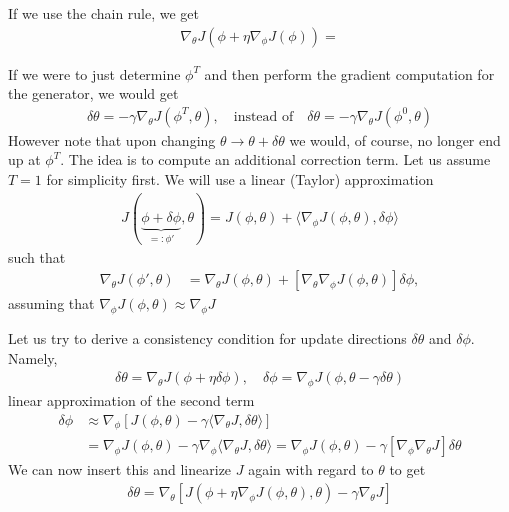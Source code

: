 \documentclass{article}
\begin{document}
\begin{enumerate}
\newpage

If we use the chain rule, we get 
\begin{align}
\nabla_\theta J(\phi+ \eta \nabla_\phi J(\phi))  = 
\end{align}


\newpage

If we were to just determine $\phi^T$ and then perform the gradient computation for the generator, we would get 
\begin{align}
\delta \theta = -\gamma \nabla_\theta J(\phi^T,\theta), \quad \text{instead of} \quad  
\delta \theta = -\gamma \nabla_\theta J(\phi^0,\theta)
\end{align}
However note that upon changing $\theta \to \theta + \delta \theta$ we would, of course, no longer end up at $\phi^T$. The idea is to compute an additional correction term. Let us assume $T=1$ for simplicity first. We will use a linear (Taylor) approximation  
\begin{align}
J(\underbrace{\phi + \delta \phi}_{=:\phi'}, \theta) = J(\phi,\theta) + \langle \nabla_\phi J(\phi,\theta),\delta \phi\rangle
\end{align}
such that 
\begin{align}
\nabla_\theta J(\phi',\theta) & =  \nabla_\theta J(\phi,\theta) + [\nabla_\theta \nabla_\phi J(\phi,\theta)] \delta \phi,
\end{align}
assuming that $\nabla_\phi J(\phi,\theta) \approx \nabla_\phi J$
\newpage

Let us try to derive a consistency condition for update directions $\delta \theta$  and $\delta \phi$. Namely,
\begin{align}
\delta \theta = \nabla_\theta J(\phi + \eta \delta \phi), \quad 
\delta \phi = \nabla_\phi J(\phi, \theta - \gamma \delta \theta)
\end{align}
linear approximation of the second term
\begin{align}
\delta \phi 
& \approx \nabla_\phi \left[ J(\phi,\theta) - \gamma \langle \nabla _\theta J, \delta \theta \rangle \right] \\
& = \nabla_\phi J(\phi,\theta) - \gamma \nabla_\phi \langle \nabla _\theta J, \delta \theta \rangle 
= \nabla_\phi J(\phi,\theta) - \gamma [\nabla_\phi \nabla _\theta J]  \delta \theta 
\end{align}
We can now insert this and linearize $J$ again with regard to $\theta$ to get 
\begin{align}
\delta \theta = \nabla_\theta 
\left[ 
J(\phi + \eta \nabla_\phi J(\phi,\theta),\theta) - \gamma \nabla_\theta J
\right]
\end{align}





\end{enumerate}
\end{document}
